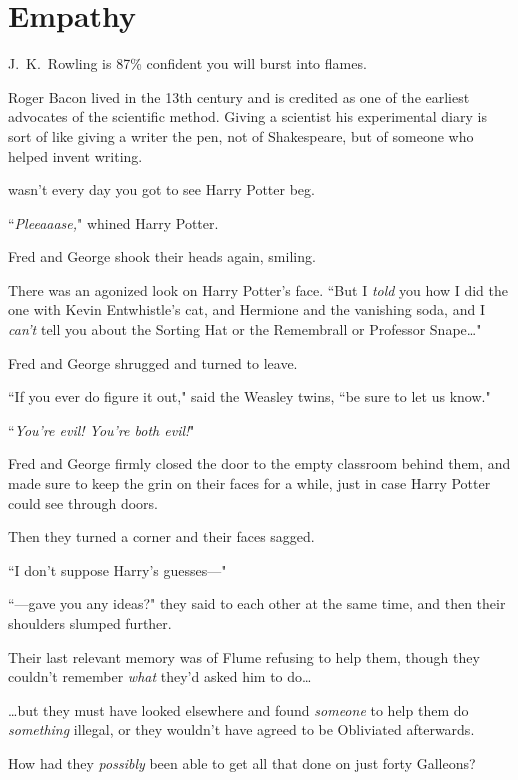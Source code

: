 \chapter{Empathy}

\begin{chapterOpeningAuthorNote}
J.~K.~Rowling is 87\% confident you will burst into flames.

Roger Bacon lived in the 13th century and is credited as one of the earliest advocates of the scientific method. Giving a scientist his experimental diary is sort of like giving a writer the pen, not of Shakespeare, but of someone who helped invent writing.
\end{chapterOpeningAuthorNote}

 wasn't every day you got to see Harry Potter beg.

\hplettrineextrapara
``\emph{Pleeaaase,}" whined Harry Potter.

Fred and George shook their heads again, smiling.

There was an agonized look on Harry Potter's face. ``But I \emph{told} you how I did the one with Kevin Entwhistle's cat, and Hermione and the vanishing soda, and I \emph{can't} tell you about the Sorting Hat or the Remembrall or Professor Snape{\ldots}"

Fred and George shrugged and turned to leave.

``If you ever do figure it out," said the Weasley twins, ``be sure to let us know."

``\emph{You're evil! You're both evil!}"

Fred and George firmly closed the door to the empty classroom behind them, and made sure to keep the grin on their faces for a while, just in case Harry Potter could see through doors.

Then they turned a corner and their faces sagged.

``I don't suppose Harry's guesses—"

``—gave you any ideas?" they said to each other at the same time, and then their shoulders slumped further.

Their last relevant memory was of Flume refusing to help them, though they couldn't remember \emph{what} they'd asked him to do{\ldots}

{\ldots}but they must have looked elsewhere and found \emph{someone} to help them do \emph{something} illegal, or they wouldn't have agreed to be Obliviated afterwards.

How had they \emph{possibly} been able to get all that done on just forty Galleons?

